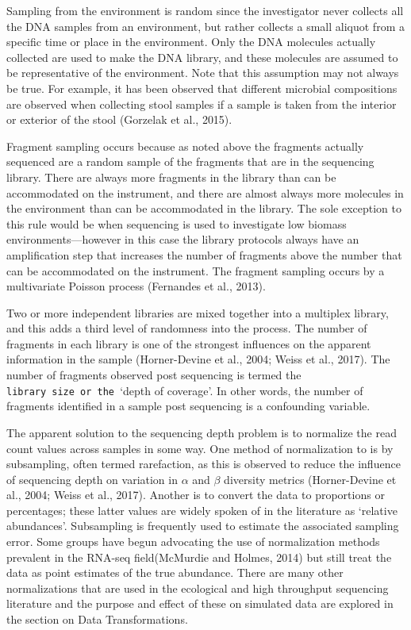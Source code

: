 \documentclass[twocolumn]{article}
\begin{document}
Sampling from the environment is random since the investigator never
collects all the DNA samples from an environment, but rather collects a
small aliquot from a specific time or place in the environment. Only the
DNA molecules actually collected are used to make the DNA library, and
these molecules are assumed to be representative of the environment.
Note that this assumption may not always be true. For example, it has
been observed that different microbial compositions are observed when
collecting stool samples if a sample is taken from the interior or
exterior of the stool (Gorzelak et al., 2015).

Fragment sampling occurs because as noted above the fragments actually
sequenced are a random sample of the fragments that are in the
sequencing library. There are always more fragments in the library than
can be accommodated on the instrument, and there are almost always more
molecules in the environment than can be accommodated in the library.
The sole exception to this rule would be when sequencing is used to
investigate low biomass environments---however in this case the library
protocols always have an amplification step that increases the number of
fragments above the number that can be accommodated on the instrument.
The fragment sampling occurs by a multivariate Poisson process
(Fernandes et al., 2013).

Two or more independent libraries are mixed together into a multiplex
library, and this adds a third level of randomness into the process. The
number of fragments in each library is one of the strongest influences
on the apparent information in the sample (Horner-Devine et al., 2004;
Weiss et al., 2017). The number of fragments observed post sequencing is
termed the
\texttt{library\ size\textquotesingle{}\ or\ the\ \textquotesingle{}}`depth
of coverage'. In other words, the number of fragments identified in a
sample post sequencing is a confounding variable.

The apparent solution to the sequencing depth problem is to normalize
the read count values across samples in some way. One method of
normalization to is by subsampling, often termed rarefaction, as this is
observed to reduce the influence of sequencing depth on variation in
\(\alpha\) and \(\beta\) diversity metrics (Horner-Devine et al., 2004;
Weiss et al., 2017). Another is to convert the data to proportions or
percentages; these latter values are widely spoken of in the literature
as `relative abundances'. Subsampling is frequently used to estimate the
associated sampling error. Some groups have begun advocating the use of
normalization methods prevalent in the RNA-seq field(McMurdie and
Holmes, 2014) but still treat the data as point estimates of the true
abundance. There are many other normalizations that are used in the
ecological and high throughput sequencing literature and the purpose and
effect of these on simulated data are explored in the section on Data
Transformations.
\end{document}
